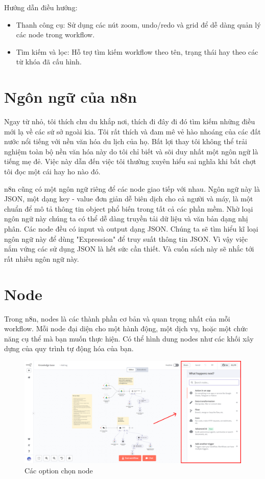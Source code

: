     
Hướng dẫn điều hướng:
\begin{itemize}
    \item Thanh công cụ: Sử dụng các nút zoom, undo/redo và grid để dễ dàng quản lý các node trong workflow.
    \item Tìm kiếm và lọc: Hỗ trợ tìm kiếm workflow theo tên, trạng thái hay theo các từ khóa đã cấu hình.
\end{itemize}

\section{Ngôn ngữ của n8n}
Ngay từ nhỏ, tôi thích chu du khắp nơi, thích đi đây đi đó tìm kiếm những điều mới lạ về các sứ sở ngoài kia. Tôi rất thích và đam mê vẻ hào nhoáng của các đất nước nổi tiếng với nền văn hóa du lịch của họ. Bất lợi thay tôi không thể trải nghiệm toàn bộ nền văn hóa này do tôi chỉ biết và sõi duy nhất một ngôn ngữ là tiếng mẹ đẻ. Việc này dẫn đến việc tôi thường xuyên hiểu sai nghĩa khi bất chợt tôi đọc một cái hay ho nào đó. 

n8n cũng có một ngôn ngữ riêng để các node giao tiếp với nhau. Ngôn ngữ này là JSON, một dạng key - value đơn giản dễ biên dịch cho cả người và máy, là một chuẩn để mô tả thông tin object phổ biến trong tất cả các phần mềm. Nhờ loại ngôn ngữ này chúng ta có thể dễ dàng truyền tải dữ liệu và văn bản dạng nhị phân. Các node đều có input và output dạng JSON. Chúng ta sẽ tìm hiểu kĩ loại ngôn ngữ này để dùng "Expression" để truy suất thông tin JSON. Vì vậy việc nắm vứng các sử dụng JSON là hết sức cần thiết. Và cuốn sách này sẽ nhắc tới rất nhiều ngôn ngữ này. 


\section{Node}

Trong n8n, nodes là các thành phần cơ bản và quan trọng nhất của mỗi workflow. Mỗi node đại diện cho một hành động, một dịch vụ, hoặc một chức năng cụ thể mà bạn muốn thực hiện. Có thể hình dung nodes như các khối xây dựng của quy trình tự động hóa của bạn.

\begin{figure}[htbp]
    \centering
    \includegraphics[width=1\linewidth]{Chap1-7/node.pdf}
    \caption{Các option chọn node}
\end{figure}

